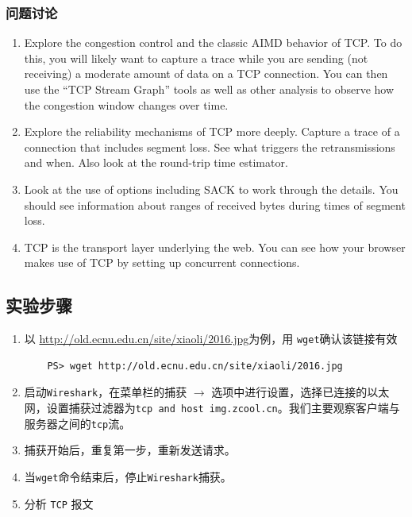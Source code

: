 \documentclass{article}
\begin{document}
\subsubsection{问题讨论}

\begin{enumerate}[noitemsep]
  \item Explore the congestion control and the classic AIMD behavior of TCP. To do this, you will likely want to capture a trace while you are sending (not receiving) a moderate amount of data on a TCP connection. You can then use the “TCP Stream Graph” tools as well as other analysis to observe how the congestion window changes over time.
  \item Explore the reliability mechanisms of TCP more deeply. Capture a trace of a connection that includes segment loss. See what triggers the retransmissions and when. Also look at the round-trip time estimator.
  \item Look at the use of options including SACK to work through the details. You should see information about ranges of received bytes during times of segment loss.
  \item TCP is the transport layer underlying the web. You can see how your browser makes use of TCP by setting up concurrent connections.
\end{enumerate}


\subsection{实验步骤}

\begin{enumerate}[noitemsep]
  \item 以 \url{http://old.ecnu.edu.cn/site/xiaoli/2016.jpg}为例，用 \texttt{wget}确认该链接有效
  \begin{lstlisting}
    PS> wget http://old.ecnu.edu.cn/site/xiaoli/2016.jpg
  \end{lstlisting}
  \item 启动\texttt{Wireshark}，在菜单栏的捕获 \( \to \) 选项中进行设置，选择已连接的以太网，设置捕获过滤器为\texttt{tcp and host img.zcool.cn}。我们主要观察客户端与服务器之间的\texttt{tcp}流。
  \item 捕获开始后，重复第一步，重新发送请求。
  \item 当\texttt{wget}命令结束后，停止\texttt{Wireshark}捕获。
  \item 分析 \texttt{TCP} 报文
\end{enumerate}
\end{document}
